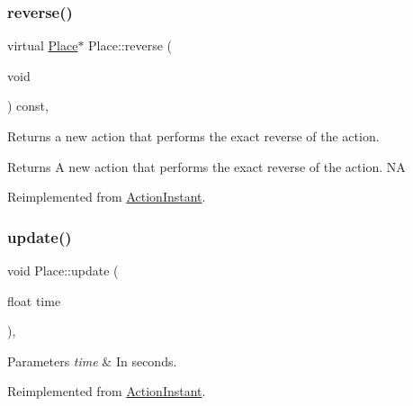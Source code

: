 \mbox{\label{classPlace_a73cc4e23e9c1dd0856b99871537986d0}} 
\subsubsection{\texorpdfstring{reverse()}{reverse()}\hspace{0.1cm}{\footnotesize\ttfamily [2/2]}}
{\footnotesize\ttfamily virtual \hyperlink{classPlace}{Place}$\ast$ Place\+::reverse (\begin{DoxyParamCaption}\item[{void}]{ }\end{DoxyParamCaption}) const\hspace{0.3cm}{\ttfamily [override]}, {\ttfamily [virtual]}}

Returns a new action that performs the exact reverse of the action.

\begin{DoxyReturn}{Returns}
A new action that performs the exact reverse of the action.  NA 
\end{DoxyReturn}


Reimplemented from \hyperlink{classActionInstant_aeb1870802c509e1f4111c863a28e9262}{Action\+Instant}.

\mbox{\label{classPlace_ac1096e69dd514a74920ae060ab1b671f}} 
\subsubsection{\texorpdfstring{update()}{update()}\hspace{0.1cm}{\footnotesize\ttfamily [1/2]}}
{\footnotesize\ttfamily void Place\+::update (\begin{DoxyParamCaption}\item[{float}]{time }\end{DoxyParamCaption})\hspace{0.3cm}{\ttfamily [override]}, {\ttfamily [virtual]}}


\begin{DoxyParams}{Parameters}
{\em time} & In seconds. \\
\hline
\end{DoxyParams}


Reimplemented from \hyperlink{classActionInstant_a59875bf08cd1f58c0c8c6693ac540ade}{Action\+Instant}.

